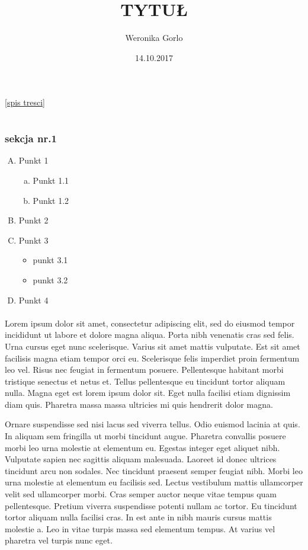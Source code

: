 \documentclass{book}
\title{ TYTUŁ}
\author{Weronika Gorlo}
\date{14.10.2017}
\begin{document}
\maketitle
\tableofcontents
\label{spis tresci}
\ref{spis tresci}
\part{}
\chapter{}
\section{sekcja nr.1}
\begin{enumerate}[A.]
\item Punkt 1
\begin{enumerate}[a)]
\item Punkt 1.1
\item Punkt 1.2
\end{enumerate}
\item Punkt 2
\item Punkt 3
\begin{itemize}
\item punkt 3.1
\item punkt 3.2
\end{itemize}
\item Punkt 4
\end{enumerate}
\lipsum
\lipsum[2-11]
\subsection{}
Lorem ipsum dolor sit amet, consectetur adipiscing elit, sed do eiusmod tempor incididunt ut labore et dolore magna aliqua. Porta nibh venenatis cras sed felis. Urna cursus eget nunc scelerisque. Varius sit amet mattis vulputate. Est sit amet facilisis magna etiam tempor orci eu. Scelerisque felis imperdiet proin fermentum leo vel. Risus nec feugiat in fermentum posuere. Pellentesque habitant morbi tristique senectus et netus et. Tellus pellentesque eu tincidunt tortor aliquam nulla. Magna eget est lorem ipsum dolor sit. Eget nulla facilisi etiam dignissim diam quis. Pharetra massa massa ultricies mi quis hendrerit dolor magna.

Ornare suspendisse sed nisi lacus sed viverra tellus. Odio euismod lacinia at quis. In aliquam sem fringilla ut morbi tincidunt augue. Pharetra convallis posuere morbi leo urna molestie at elementum eu. Egestas integer eget aliquet nibh. Vulputate sapien nec sagittis aliquam malesuada. Laoreet id donec ultrices tincidunt arcu non sodales. Nec tincidunt praesent semper feugiat nibh. Morbi leo urna molestie at elementum eu facilisis sed. Lectus vestibulum mattis ullamcorper velit sed ullamcorper morbi. Cras semper auctor neque vitae tempus quam pellentesque. Pretium viverra suspendisse potenti nullam ac tortor. Eu tincidunt tortor aliquam nulla facilisi cras. In est ante in nibh mauris cursus mattis molestie a. Leo in vitae turpis massa sed elementum tempus. At varius vel pharetra vel turpis nunc eget.
\end{document}
